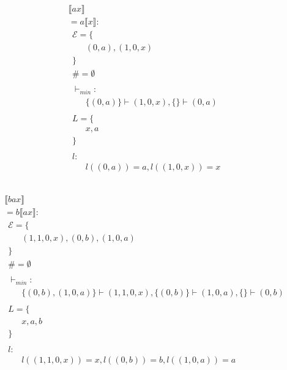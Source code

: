 \begin{align*} 
	 &  & \\ 
	 & \llbracket ax \rrbracket & \\ 
	 & = a\llbracket x \rrbracket:  & \\ 
	 & \ \ \mathcal{{E}}= \{  & \\ 
	 & \qquad (0, a), (1, 0, x) \\ 
	 & \ \ \} & \\ 
	 & \ \ \# = \emptyset & \\ 
	 & \ \  & \\ 
	 & \ \ \vdash_{{min}}: & \\ 
	 & \qquad \{ (0, a) \} \vdash (1, 0, x), \{  \} \vdash (0, a) \\ 
	 & \ \  & \\ 
	 & \ \ L=\{ & \\ 
	 & \qquad x, a \\ 
	 & \ \ \} & \\ 
	 & \ \  & \\ 
	 & \ \ l: & \\ 
	 & \qquad l((0, a)) = a, l((1, 0, x)) = x \\ 
	 & \ \  & \\ 
\end{align*} 

\begin{align*} 
	 &  & \\ 
	 & \llbracket bax \rrbracket & \\ 
	 & = b\llbracket ax \rrbracket:  & \\ 
	 & \ \ \mathcal{{E}}= \{  & \\ 
	 & \qquad (1, 1, 0, x), (0, b), (1, 0, a) \\ 
	 & \ \ \} & \\ 
	 & \ \ \# = \emptyset & \\ 
	 & \ \  & \\ 
	 & \ \ \vdash_{{min}}: & \\ 
	 & \qquad \{ (0, b), (1, 0, a) \} \vdash (1, 1, 0, x), \{ (0, b) \} \vdash (1, 0, a), \{  \} \vdash (0, b) \\ 
	 & \ \  & \\ 
	 & \ \ L=\{ & \\ 
	 & \qquad x, a, b \\ 
	 & \ \ \} & \\ 
	 & \ \  & \\ 
	 & \ \ l: & \\ 
	 & \qquad l((1, 1, 0, x)) = x, l((0, b)) = b, l((1, 0, a)) = a \\ 
	 & \ \  & \\ 
\end{align*} 

